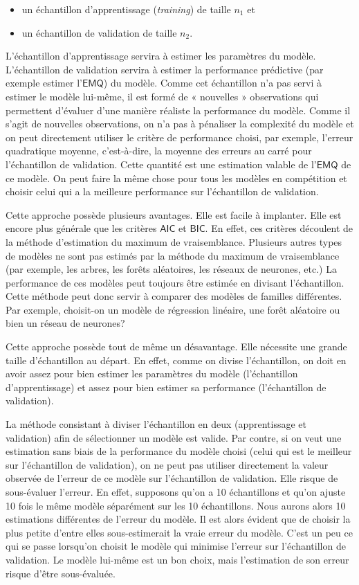 \documentclass[
  11pt,
  letterpaper,
]{book}
\providecommand{\tightlist}{%
  \setlength{\itemsep}{0pt}\setlength{\parskip}{0pt}}
\theoremstyle{definition}
\theoremstyle{definition}
\theoremstyle{definition}
\theoremstyle{remark}
\begin{document}
\begin{itemize}
\tightlist
\item
  un échantillon d'apprentissage (\emph{training}) de taille \(n_1\) et
\item
  un échantillon de validation de taille \(n_2\).
\end{itemize}

L'échantillon d'apprentissage servira à estimer les paramètres du modèle. L'échantillon de validation servira à estimer la performance prédictive (par exemple estimer l'\(\mathsf{EMQ}\)) du modèle. Comme cet échantillon n'a pas servi à estimer le modèle lui-même, il est formé de « nouvelles » observations qui permettent d'évaluer d'une manière réaliste la performance du modèle. Comme il s'agit de nouvelles observations, on n'a pas à pénaliser la complexité du modèle et on peut directement utiliser le critère de performance choisi, par exemple, l'erreur quadratique moyenne, c'est-à-dire, la moyenne des erreurs au carré pour l'échantillon de validation. Cette quantité est une estimation valable de l'\(\mathsf{EMQ}\) de ce modèle. On peut faire la même chose pour tous les modèles en compétition et choisir celui qui a la meilleure performance sur l'échantillon de validation.

Cette approche possède plusieurs avantages. Elle est facile à implanter. Elle est encore plus générale que les critères \(\mathsf{AIC}\) et \(\mathsf{BIC}\). En effet, ces critères découlent de la méthode d'estimation du maximum de vraisemblance. Plusieurs autres types de modèles ne sont pas estimés par la méthode du maximum de vraisemblance (par exemple, les arbres, les forêts aléatoires, les réseaux de neurones, etc.) La performance de ces modèles peut toujours être estimée en divisant l'échantillon. Cette méthode peut donc servir à comparer des modèles de familles différentes. Par exemple, choisit-on un modèle de régression linéaire, une forêt aléatoire ou bien un réseau de neurones?

Cette approche possède tout de même un désavantage. Elle nécessite une grande taille d'échantillon au départ. En effet, comme on divise l'échantillon, on doit en avoir assez pour bien estimer les paramètres du modèle (l'échantillon d'apprentissage) et assez pour bien estimer sa performance (l'échantillon de validation).

La méthode consistant à diviser l'échantillon en deux (apprentissage et validation) afin de sélectionner un modèle est valide. Par contre, si on veut une estimation sans biais de la performance du modèle choisi (celui qui est le meilleur sur l'échantillon de validation), on ne peut pas utiliser directement la valeur observée de l'erreur de ce modèle sur l'échantillon de validation. Elle risque de sous-évaluer l'erreur. En effet, supposons qu'on a 10 échantillons et qu'on ajuste 10 fois le même modèle séparément sur les 10 échantillons. Nous aurons alors 10 estimations différentes de l'erreur du modèle. Il est alors évident que de choisir la plus petite d'entre elles sous-estimerait la vraie erreur du modèle. C'est un peu ce qui se passe lorsqu'on choisit le modèle qui minimise l'erreur sur l'échantillon de validation. Le modèle lui-même est un bon choix, mais l'estimation de son erreur risque d'être sous-évaluée.
\end{document}

